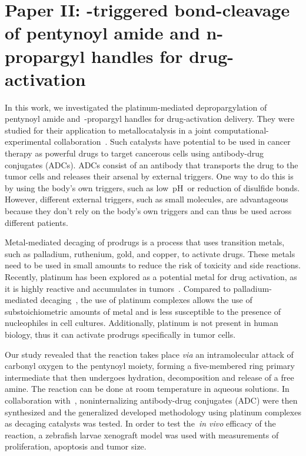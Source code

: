 \chapter{Paper II:\@
  -triggered bond-cleavage of pentynoyl amide
  and n-propargyl handles for drug-activation
 }%
\label{ch:paper2}

\begin{citacao}
\end{citacao}

In this work,
we investigated the platinum-mediated depropargylation of pentynoyl amide
and~-propargyl handles for drug-activation delivery.
They were studied for their application to metallocatalysis in a joint computational-experimental collaboration~\cite{Oliveira_2020}.
Such catalysts have potential to be used in cancer therapy as powerful drugs to target cancerous cells using antibody-drug conjugates (ADCs).
ADCs consist of an antibody that transports the drug to the tumor cells
and releases their arsenal by external triggers.
One way to do this is by using the body's own triggers,
such as low~pH~or reduction of disulfide bonds.
However,
different external triggers,
such as small molecules,
are advantageous because they don't rely on the body's own triggers and can thus be used across different patients.

Metal-mediated decaging of prodrugs is a process that uses transition metals,
such as palladium,
ruthenium,
gold,
and copper,
to activate drugs.
These metals need to be used in small amounts to reduce the risk of toxicity and side reactions.
Recently,
platinum has been explored as a potential metal for drug activation,
as it is highly reactive and accumulates in tumors~\cite{Miller_2017,Oliveira_2020}.
Compared to palladium-mediated decaging~\cite{Coelho_2019},
the use of platinum complexes allows the use of substoichiometric amounts of metal
and is less susceptible to the presence of nucleophiles in cell cultures.
Additionally,
platinum is not present in human biology,
thus it can activate prodrugs specifically in tumor cells.

Our study revealed that the reaction takes place \emph{via} an intramolecular
attack of carbonyl oxygen to the pentynoyl moiety,
forming a five-membered ring primary intermediate that then undergoes hydration,
decomposition and release of a free amine.
The reaction can be done at room temperature in aqueous solutions.
In collaboration with~\citeauthor{Oliveira_2020},
noninternalizing antibody-drug conjugates (ADC)
were then synthesized
and the generalized developed methodology using platinum complexes as decaging catalysts
was tested.
In order to test the~\emph{in vivo} efficacy of the reaction,
a zebrafish larvae xenograft model was used with measurements of proliferation,
apoptosis and tumor size.

